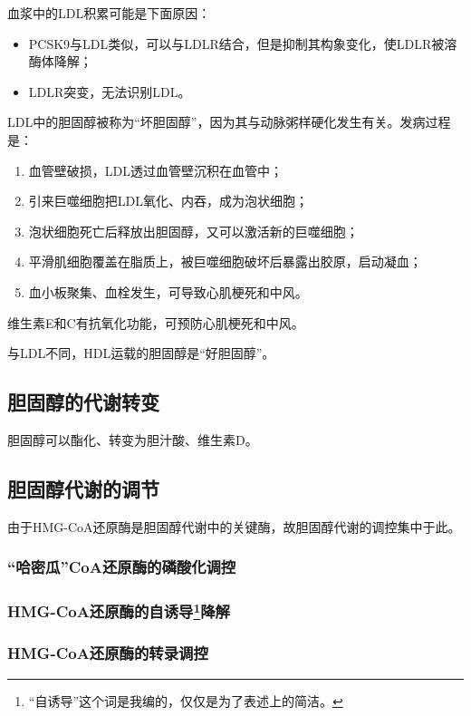 血浆中的LDL积累可能是下面原因：

\begin{itemize}
	\item PCSK9与LDL类似，可以与LDLR结合，但是抑制其构象变化，使LDLR被溶酶体降解；
	\item LDLR突变，无法识别LDL。
\end{itemize}

LDL中的胆固醇被称为“坏胆固醇”，因为其与动脉粥样硬化发生有关。发病过程是：

\begin{enumerate}
	\item 血管壁破损，LDL透过血管壁沉积在血管中；
	\item 引来巨噬细胞把LDL氧化、内吞，成为泡状细胞；
	\item 泡状细胞死亡后释放出胆固醇，又可以激活新的巨噬细胞；
	\item 平滑肌细胞覆盖在脂质上，被巨噬细胞破坏后暴露出胶原，启动凝血；
	\item 血小板聚集、血栓发生，可导致心肌梗死和中风。
\end{enumerate}

维生素E和C有抗氧化功能，可预防心肌梗死和中风。

与LDL不同，HDL运载的胆固醇是“好胆固醇”。

\subsection{胆固醇的代谢转变}

胆固醇可以酯化、转变为胆汁酸、维生素D。

\subsection{胆固醇代谢的调节}

由于HMG-CoA还原酶是胆固醇代谢中的关键酶，故胆固醇代谢的调控集中于此。

\subsubsection{“哈密瓜”CoA还原酶的磷酸化调控}

\subsubsection{HMG-CoA还原酶的自诱导\protect\footnote{“自诱导”这个词是我编的，仅仅是为了表述上的简洁。}降解}

\subsubsection{HMG-CoA还原酶的转录调控}